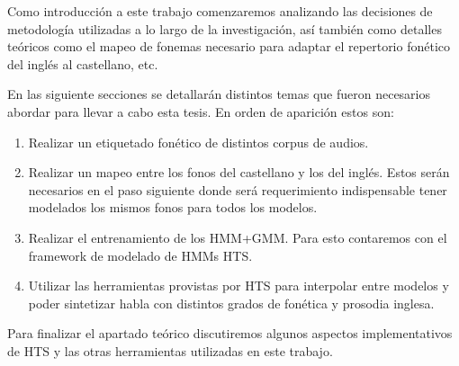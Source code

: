 Como introducción a este trabajo comenzaremos analizando las decisiones de metodología utilizadas a lo largo de la investigación, así también como detalles teóricos como el mapeo de fonemas necesario para adaptar el repertorio fonético del inglés al castellano, etc.

En las siguiente secciones se detallarán distintos temas que fueron necesarios abordar para llevar a cabo esta tesis. En orden de aparición estos son:

\begin{enumerate}
\item Realizar un etiquetado fonético de distintos corpus de audios.

\item Realizar un mapeo entre los fonos del castellano y los del inglés. Estos serán necesarios en el paso siguiente donde será requerimiento indispensable tener modelados los mismos fonos para todos los modelos.

\item Realizar el entrenamiento de los HMM+GMM. Para esto contaremos con el framework de modelado de HMMs HTS. 

\item Utilizar las herramientas provistas por HTS para interpolar entre modelos y poder sintetizar habla con distintos grados de fonética y prosodia inglesa.

\end{enumerate}

Para finalizar el apartado teórico discutiremos algunos aspectos implementativos de HTS y las otras herramientas utilizadas en este trabajo.
